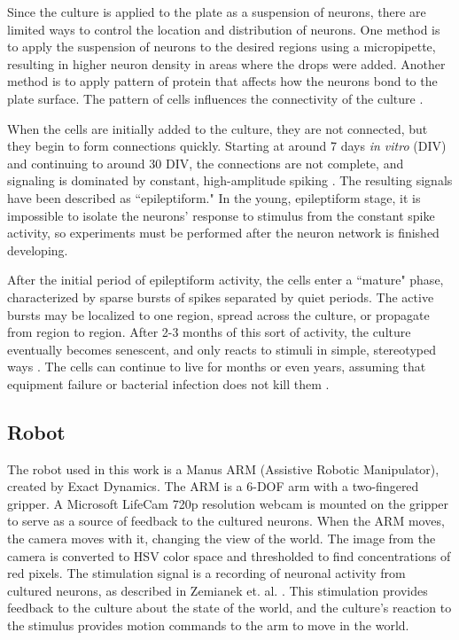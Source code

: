 \documentclass[letterpaper]{article}
\begin{document}
Since the culture is applied to the plate as a suspension of neurons, there are limited ways to control the location and distribution of neurons. 
One method is to apply the suspension of neurons to the desired regions using a micropipette, resulting in higher neuron density in areas where the drops were added. 
Another method is to apply pattern of protein that affects how the neurons bond to the plate surface.
The pattern of cells influences the connectivity of the culture \cite{sorkin2006compact}.

When the cells are initially added to the culture, they are not connected, but they begin to form connections quickly.
Starting at around 7 days \emph{in vitro} (DIV) and continuing to around 30 DIV, the connections are not complete, and signaling is dominated by constant, high-amplitude spiking \cite{warwick2010controlling}. 
The resulting signals have been described as ``epileptiform."
In the young, epileptiform stage, it is impossible to isolate the neurons' response to stimulus from the constant spike activity, so experiments must be performed after the neuron network is finished developing. 

After the initial period of epileptiform activity, the cells enter a ``mature" phase, characterized by sparse bursts of spikes separated by quiet periods. 
The active bursts may be localized to one region, spread across the culture, or propagate from region to region. 
After 2-3 months of this sort of activity, the culture eventually becomes senescent, and only reacts to stimuli in simple, stereotyped ways \cite{warwick2010controlling}. 
The cells can continue to live for months or even years, assuming that equipment failure or bacterial infection does not kill them \cite{potter2001new}. 

\subsection{Robot}

The robot used in this work is a Manus ARM (Assistive Robotic Manipulator), created by Exact Dynamics.
The ARM is a 6-DOF arm with a two-fingered gripper. 
A Microsoft LifeCam 720p resolution webcam is mounted on the gripper to serve as a source of feedback to the cultured neurons. 
When the ARM moves, the camera moves with it, changing the view of the world. 
The image from the camera is converted to HSV color space and thresholded to find concentrations of red pixels.
The stimulation signal is a recording of neuronal activity from cultured neurons, as described in Zemianek et. al. .
This stimulation provides feedback to the culture about the state of the world, and the culture's reaction to the stimulus provides motion commands to the arm to move in the world. 
\end{document}
